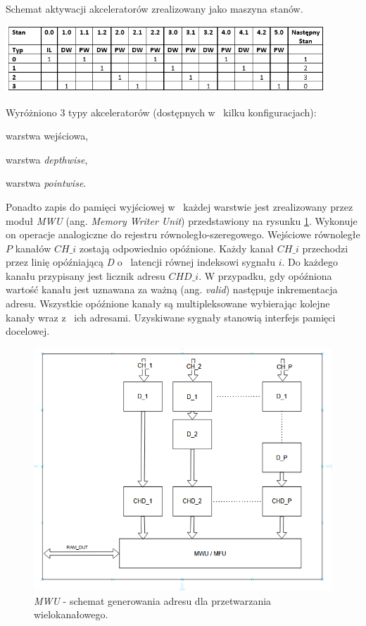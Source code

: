 \begin{table}
    \centering
    \caption{Schemat aktywacji akceleratorów zrealizowany jako maszyna stanów.}
    \label{tab:LNACC}
    \includegraphics[width=0.9\textwidth]{images/acc_activ.png}
\end{table}
Wyróżniono 3 typy akceleratorów (dostępnych w~ kilku konfiguracjach):
\begin{description}
\item warstwa wejściowa,
\item warstwa \emph{depthwise},
\item warstwa \emph{pointwise}.
\end{description}

Ponadto zapis do pamięci wyjściowej w~ każdej warstwie jest zrealizowany przez moduł \emph{MWU} (ang. \emph{Memory Writer Unit}) przedstawiony na rysunku \ref{fig:mwu}.
Wykonuje on operacje analogiczne do rejestru równoległo-szeregowego.
Wejściowe równoległe $P$ kanałów $CH\_i$ zostają odpowiednio opóźnione. 
Każdy kanał $CH\_{i}$ przechodzi przez linię opóźniającą \emph{D} o~ latencji równej indeksowi sygnału $i$.
Do każdego kanału przypisany jest licznik adresu $CHD\_i$.
W przypadku, gdy opóźniona wartość kanału jest uznawana za ważną (ang. \emph{valid}) następuje inkrementacja adresu.
Wszystkie opóźnione kanały są multipleksowane wybierając kolejne kanały wraz z~ ich adresami.
Uzyskiwane sygnały stanowią interfejs pamięci docelowej.

\begin{figure}
    \centering
    \includegraphics[width=0.8\linewidth]{images/MWU.png}
    \caption{\emph{MWU} - schemat generowania adresu dla przetwarzania wielokanałowego.}
    \label{fig:mwu}
\end{figure}

